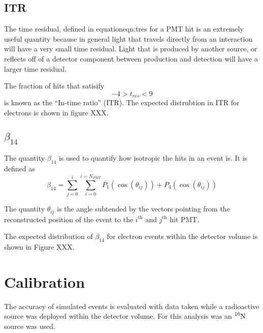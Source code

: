 \subsection{ITR}
The time residual, defined in equation{eqn:tres} for a PMT hit is an extremely useful quantity because in
general light that travels directly from an interaction will have a very small
time residual.
Light that is produced by another source, or reflects off of a detector component
between production and detection will have a larger time residual.

The fraction of hits that satisify
\begin{equation}
    -4 > t_{res} < 9 %
\end{equation}
is known as the ``In-time ratio'' (ITR).
The expected distrubtion in ITR for electrons is shown in figure XXX.

\subsection{$\beta_{14}$}
The quantity $\beta_{14}$ is used to quantify how isotropic the hits
in an event is. It is defined as
\begin{equation}
    \beta_{14} = \sum_{j=0}^{i}\sum_{i=0}^{i=N_{PMT}} P_{1}(\cos(\theta_{ij})) + P_{4}(\cos(\theta_{ij}))
\end{equation}

The quantity $\theta_{ij}$ is the angle subtended by the vectors pointing
from the reconstructed position of the event to the $i^{\text{th}}$ and
$j^{\text{th}}$ hit PMT.

The expected distribution of $\beta_{14}$ for electron events within the
detector volume is shown in Figure XXX.

\section{Calibration}
The accuracy of simulated events is evaluated with data taken while a
radioactive source was deployed within the detector volume.
For this analysis was an $\ce{^{16}N}$ source was used.

